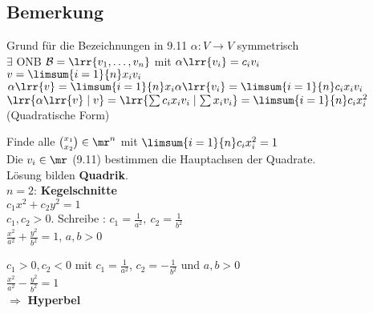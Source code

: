 \subsection{Bemerkung}
	Grund für die Bezeichnungen in 9.11 $\alpha:V\rightarrow V$ symmetrisch\\
	$\exists$ ONB $\mathcal{B}=\lrr{v_1,\dots,v_n}$ mit $\alpha\lrr{v_i}=c_iv_i$\\
	$v=\limsum{i=1}{n} x_iv_i$\\
	$\alpha\lrr{v}=\limsum{i=1}{n} x_i\alpha\lrr{v_i}=\limsum{i=1}{n} c_ix_iv_i$\\
	$\lrr{\alpha\lrr{v}\mid v}=\lrr{\sum c_ix_iv_i\mid\sum x_iv_i}=\limsum{i=1}{n} c_ix_i^2$ (Quadratische Form)

	Finde alle $ \binom{x_1} {x_2}\in\mr^n $ mit $ \limsum{i=1}{n}c_ix_i^2=1 $\\
	Die $ v_i\in\mr $ (9.11) bestimmen die Hauptachsen der Quadrate.\\
	Lösung bilden \textbf{Quadrik}.\\
	$ n=2 $: \textbf{Kegelschnitte}\\
	$ c_1x^2+c_2y^2=1 $\\
	$c_1,c_2>0$. Schreibe : $ c_1=\frac{1}{a^2},\ c_2=\frac{1}{b^2} $\\
	$ \frac{x^2}{a^2}+\frac{y^2}{b^2}=1 $, $ a,b>0 $

	$c_1>0, c_2<0$ mit $c_1=\frac{1}{a^2}$, $c_2=-\frac{1}{b^2}$ und $a,b>0$\\
	$\frac{x^2}{a^2}-\frac{y^2}{b^2}=1$\\
	$\Rightarrow$ \textbf{Hyperbel}

